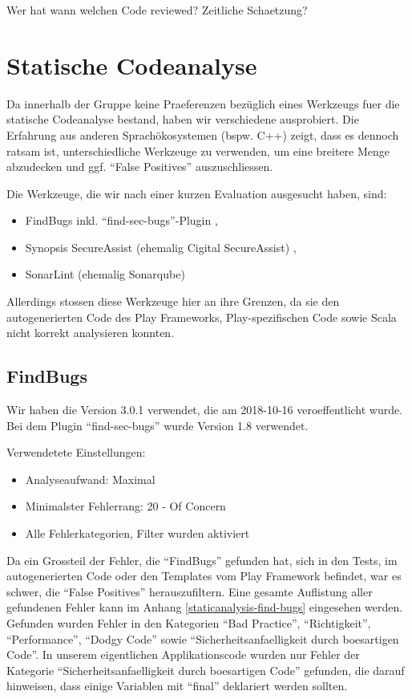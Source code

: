 \documentclass[12pt,DIV14,BCOR10mm,a4paper,twoside,parskip=half-,headsepline,headinclude,english,ngerman,bibliography=totocnumbered]{scrreprt}
\begin{document}
Wer hat wann welchen Code reviewed?
Zeitliche Schaetzung?

\section{Statische Codeanalyse}

Da innerhalb der Gruppe keine Praeferenzen bezüglich eines Werkzeugs fuer die statische Codeanalyse bestand, haben wir verschiedene ausprobiert.
Die Erfahrung aus anderen Sprachökosystemen (bspw. C++) zeigt, dass es dennoch ratsam ist, unterschiedliche Werkzeuge zu verwenden, um eine breitere Menge abzudecken und ggf. \enquote{False Positives} auszuschliessen.

Die Werkzeuge, die wir nach einer kurzen Evaluation ausgesucht haben, sind:

\begin{itemize}
  \item FindBugs \autocite{FindBugs} inkl. \enquote{find-sec-bugs}-Plugin \autocite{FindBugs.FindSecBugs},
  \item Synopsis SecureAssist (ehemalig Cigital SecureAssist) \autocite{SecureAssist},
  \item SonarLint (ehemalig Sonarqube) \autocite{SonarLint}
\end{itemize}

Allerdings stossen diese Werkzeuge hier an ihre Grenzen, da sie den autogenerierten Code des Play Frameworks, Play-spezifischen Code sowie Scala nicht korrekt analysieren konnten.

\subsection{FindBugs}

Wir haben die Version 3.0.1 verwendet, die am 2018-10-16 veroeffentlicht wurde.
Bei dem Plugin \enquote{find-sec-bugs} wurde Version 1.8 verwendet.

Verwendetete Einstellungen:

\begin{itemize}
  \item Analyseaufwand: Maximal
  \item Minimalster Fehlerrang: 20 - Of Concern
  \item Alle Fehlerkategorien, Filter wurden aktiviert
\end{itemize}

Da ein Grossteil der Fehler, die \enquote{FindBugs} gefunden hat, sich in den Tests, im autogenerierten Code oder den Templates vom Play Framework befindet, war es schwer, die \enquote{False Positives} herauszufiltern.
Eine gesamte Auflistung aller gefundenen Fehler kann im Anhang \ref{staticanalysis-find-bugs} eingesehen werden.
Gefunden wurden Fehler in den Kategorien \enquote{Bad Practice}, \enquote{Richtigkeit}, \enquote{Performance}, \enquote{Dodgy Code} sowie \enquote{Sicherheitsanfaelligkeit durch boesartigen Code}.
In unserem eigentlichen Applikationscode wurden nur Fehler der Kategorie \enquote{Sicherheitsanfaelligkeit durch boesartigen Code} gefunden, die darauf hinweisen, dass einige Variablen mit \enquote{final} deklariert werden sollten.
\end{document}
